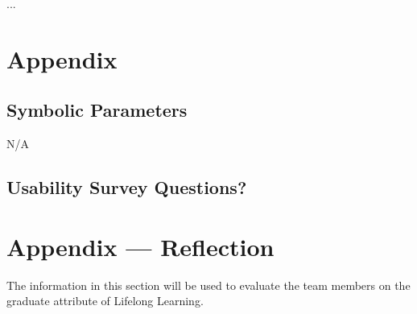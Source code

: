 \documentclass[12pt, titlepage]{article}
\begin{document}
...
				




\newpage

\section{Appendix} \label{section:6}

\subsection{Symbolic Parameters}  \label{section:6.1}

N/A

\subsection{Usability Survey Questions?} \label{section:6.2}



\newpage{}
\section*{Appendix --- Reflection}


The information in this section will be used to evaluate the team members on the
graduate attribute of Lifelong Learning.


\end{document}
